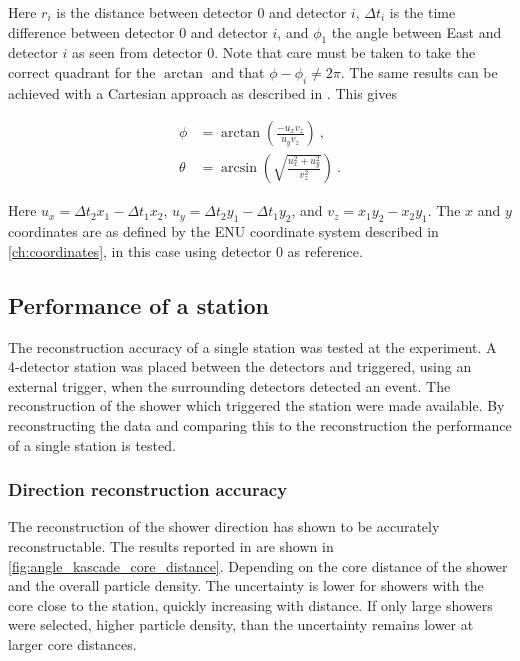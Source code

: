 Here $r_i$ is the distance between detector 0 and detector $i$, $\Delta t_i$ is the time difference between detector 0 and detector $i$, and $\phi_1$ the angle between East and detector $i$ as seen from detector 0. Note that care must be taken to take the correct quadrant for the $\arctan$ and that $\phi - \phi_i \ne 2 \pi$. The same results can be achieved with a Cartesian approach as described in \cite{montanus2015direction}. This gives

\begin{equation}
    \label{eq:direction-2dflat-cart}
    \begin{split}
        \phi &= \arctan \left(\frac{-u_x v_z}{u_y v_z} \right) \ , \\
        \theta &= \arcsin \left(\sqrt{\frac{u_x^2+u_y^2}{v_z^2}} \right) \ .
    \end{split}
\end{equation}

Here $u_x = \Delta t_2 x_1 - \Delta t_1 x_2$, $u_y = \Delta t_2 y_1 - \Delta t_1 y_2$, and $v_z = x_1 y_2 - x_2 y_1$. The $x$ and $y$ coordinates are as defined by the ENU coordinate system described in \cref{ch:coordinates}, in this case using detector 0 as reference.


\subsection{Performance of a station}

The reconstruction accuracy of a single \hisparc station was tested at the \kascade experiment. A 4-detector \hisparc station was placed between the \kascade detectors and triggered, using an external trigger, when the surrounding \kascade detectors detected an event. The \kascade reconstruction of the shower which triggered the \hisparc station were made available. By reconstructing the \hisparc data and comparing this to the \kascade reconstruction the performance of a single station is tested.


\subsubsection{Direction reconstruction accuracy}

The reconstruction of the shower direction has shown to be accurately reconstructable. The results reported in \cite{fokkema2012hisparc} are shown in \cref{fig:angle_kascade_core_distance}. Depending on the core distance of the shower and the overall particle density. The uncertainty is lower for showers with the core close to the station, quickly increasing with distance. If only large showers were selected, higher particle density, than the uncertainty remains lower at larger core distances.

